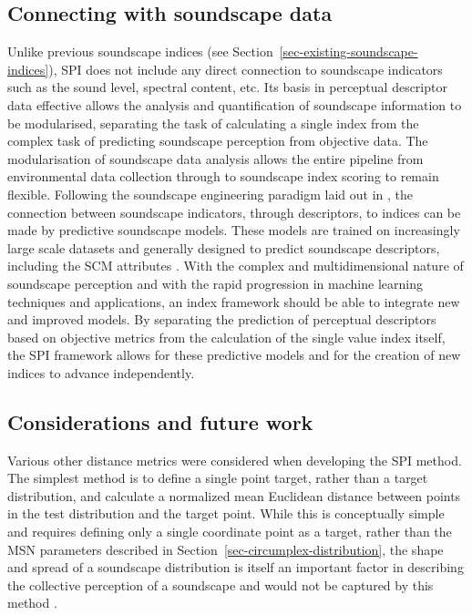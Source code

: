 \documentclass[
  authoryear,
  preprint,
  3p]{elsarticle}
\begin{document}
\subsection{Connecting with soundscape
data}\label{connecting-with-soundscape-data}

Unlike previous soundscape indices (see
Section~\ref{sec-existing-soundscape-indices}), SPI does not include any
direct connection to soundscape indicators such as the sound level,
spectral content, etc. Its basis in perceptual descriptor data effective
allows the analysis and quantification of soundscape information to be
modularised, separating the task of calculating a single index from the
complex task of predicting soundscape perception from objective data.
The modularisation of soundscape data analysis allows the entire
pipeline from environmental data collection through to soundscape index
scoring to remain flexible. Following the soundscape engineering
paradigm laid out in \citet{Mitchell2023conceptual}, the connection
between soundscape indicators, through descriptors, to indices can be
made by predictive soundscape models. These models are trained on
increasingly large scale datasets and generally designed to predict
soundscape descriptors, including the SCM attributes
\citep[\citet{Hou2024Soundscape}]{Ooi2022Probably}. With the complex and
multidimensional nature of soundscape perception and with the rapid
progression in machine learning techniques and applications, an index
framework should be able to integrate new and improved models. By
separating the prediction of perceptual descriptors based on objective
metrics from the calculation of the single value index itself, the SPI
framework allows for these predictive models and for the creation of new
indices to advance independently.

\subsection{Considerations and future work}\label{limitations}

Various other distance metrics were considered when developing the SPI
method. The simplest method is to define a single point target, rather
than a target distribution, and calculate a normalized mean Euclidean
distance between points in the test distribution and the target point.
While this is conceptually simple and requires defining only a single
coordinate point as a target, rather than the MSN parameters described
in Section~\ref{sec-circumplex-distribution}, the shape and spread of a
soundscape distribution is itself an important factor in describing the
collective perception of a soundscape and would not be captured by this
method \citep{Mitchell2022How}.
\end{document}
